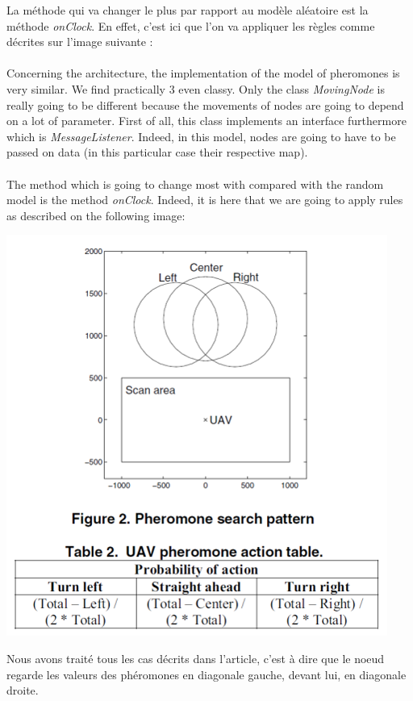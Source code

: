 La méthode qui va changer le plus par rapport au modèle aléatoire est la méthode \textit{onClock}. En effet, c'est ici que l'on va appliquer les règles comme décrites sur l'image suivante : \\\\

Concerning the architecture, the implementation of the model of pheromones is very similar. We find practically 3 even classy. Only the class \textit{MovingNode} is really going to be different because the movements of nodes are going to depend on a lot of parameter. First of all, this class implements an interface furthermore which is \textit{MessageListener}. Indeed, in this model, nodes are going to have to be passed on data (in this particular case their respective map). \\\\

The method which is going to change most with compared with the random model is the method \textit{onClock}. Indeed, it is here that we are going to apply rules as described on the following image:

\begin{center}
\includegraphics{../images/pheromon_model.png}
\end{center}

Nous avons traité tous les cas décrits dans l'article, c'est à dire que le noeud regarde les valeurs des phéromones en diagonale gauche, devant lui, en diagonale droite.\\\\

